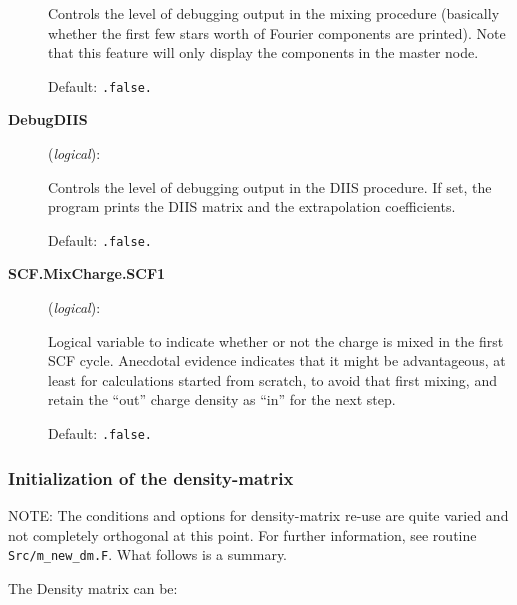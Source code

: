 \begin{description}
Controls the level of debugging output in the mixing procedure
(basically whether the first few stars worth of Fourier components are
printed). Note that this feature will only display the components in
the master node.

Default: \texttt{.false.}

\item[\textbf{DebugDIIS}] (\textit{logical}):

Controls the level of debugging output in the DIIS procedure. If set,
the program prints the DIIS matrix and the extrapolation coefficients.

Default: \texttt{.false.}

\item[\textbf{SCF.MixCharge.SCF1}] (\textit{logical}):

Logical variable to indicate whether or not the charge is mixed in the
first SCF cycle. Anecdotal evidence indicates that it might be
advantageous, at least for calculations started from scratch, to avoid
that first mixing, and retain the ``out'' charge density as ``in'' for
the next step. 

Default: \texttt{.false.}


\end{description}

\subsubsection{Initialization of the density-matrix}

NOTE: The conditions and options for density-matrix re-use are quite
varied and not completely orthogonal at this point. For further
information, see routine \texttt{Src/m\_new\_dm.F}. What follows is a
summary.

The Density matrix can be:

